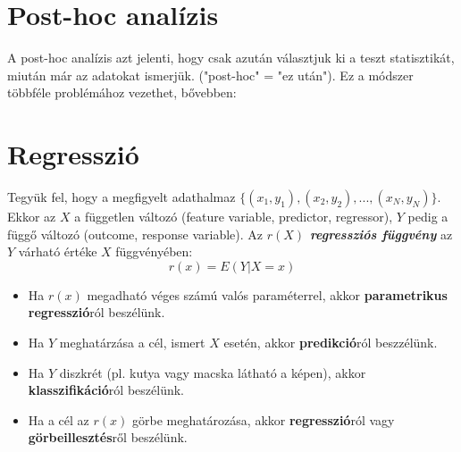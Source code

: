 \documentclass[12pt]{article}
\theoremstyle{plain}
\begin{document}
\section{Post-hoc analízis}
A post-hoc analízis azt jelenti, hogy csak azután választjuk ki a teszt statisztikát, miután már az adatokat ismerjük.
("post-hoc" = "ez után").
Ez a módszer többféle problémához vezethet, bővebben: \cite{posthoc, dredging}

\section{Regresszió}
Tegyük fel, hogy a megfigyelt adathalmaz $\{(x_1, y_1), (x_2, y_2), ..., (x_N, y_N)\}$. Ekkor az $X$ a független változó
(feature variable, predictor, regressor), $Y$ pedig a függő változó (outcome, response variable).
Az \textbf{\textit{$r(X)$ regressziós függvény}} az $Y$ várható értéke $X$ függvényében:
\begin{equation*}
    r(x) = E(Y|X=x)
\end{equation*}
\begin{itemize}
    \item Ha $r(x)$ megadható véges számú valós paraméterrel, akkor \textbf{parametrikus regresszió}ról beszélünk.
    \item Ha $Y$ meghatárzása a cél, ismert $X$ esetén, akkor \textbf{predikció}ról beszzélünk.
    \item Ha $Y$ diszkrét (pl. kutya vagy macska látható a képen), akkor \textbf{klasszifikáció}ról beszélünk.
    \item Ha a cél az $r(x)$ görbe meghatározása, akkor \textbf{regresszió}ról vagy \textbf{görbeillesztés}ről beszélünk.
\end{itemize}
\end{document}
